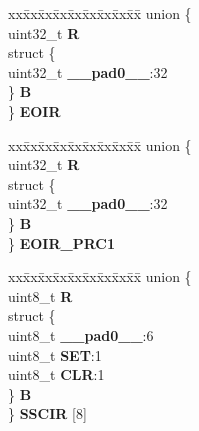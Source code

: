 \begin{DoxyCompactItemize}
\begin{tabbing}
\end{tabbing}\item 
\mbox{\label{structINTC__tag_a5fe0335d96e19b8afe6ed8c98bd61d85}} 
\begin{tabbing}
xx\=xx\=xx\=xx\=xx\=xx\=xx\=xx\=xx\=\kill
union \{\\
\>uint32\_t {\bfseries R}\\
\>struct \{\\
\>\>uint32\_t {\bfseries \_\_pad0\_\_}:32\\
\>\} {\bfseries B}\\
\} {\bfseries EOIR}\\

\end{tabbing}\item 
\mbox{\label{structINTC__tag_af25ed75a2ca6466b4e72de8a80ffd316}} 
\begin{tabbing}
xx\=xx\=xx\=xx\=xx\=xx\=xx\=xx\=xx\=\kill
union \{\\
\>uint32\_t {\bfseries R}\\
\>struct \{\\
\>\>uint32\_t {\bfseries \_\_pad0\_\_}:32\\
\>\} {\bfseries B}\\
\} {\bfseries EOIR\_PRC1}\\

\end{tabbing}\item 
\mbox{\label{structINTC__tag_a93601933c481ebdb0fde77e190486353}} 
\begin{tabbing}
xx\=xx\=xx\=xx\=xx\=xx\=xx\=xx\=xx\=\kill
union \{\\
\>uint8\_t {\bfseries R}\\
\>struct \{\\
\>\>uint8\_t {\bfseries \_\_pad0\_\_}:6\\
\>\>uint8\_t {\bfseries SET}:1\\
\>\>uint8\_t {\bfseries CLR}:1\\
\>\} {\bfseries B}\\
\} {\bfseries SSCIR} \mbox{[}8\mbox{]}\\


\end{tabbing}
\end{DoxyCompactItemize}
